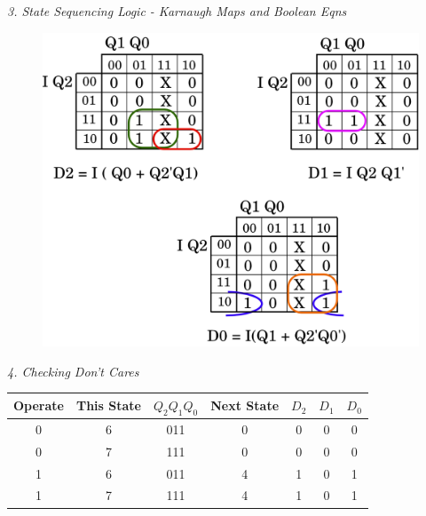 \documentclass[twocolumn,english]{article}
\providecommand{\tabularnewline}{\\}
\begin{document}
\emph{3. State Sequencing Logic - Karnaugh Maps and Boolean Eqns}

\begin{figure}[H]
\noindent \centering{}\includegraphics[width=0.2\paperwidth]{img/ssl-kmaps}
\end{figure}


\emph{4. Checking Don't Cares}

\noindent 
\begin{table}[H]
\noindent \begin{centering}
\begin{tabular}{ccccccc}
\toprule 
{\footnotesize{}Operate} & {\footnotesize{}This State} & {\footnotesize{}$Q_{2}Q_{1}Q_{0}$} & {\footnotesize{}Next State} & {\footnotesize{}$D_{2}$} & {\footnotesize{}$D_{1}$} & {\footnotesize{}$D_{0}$}\tabularnewline
\midrule
{\footnotesize{}0} & {\footnotesize{}6} & {\footnotesize{}011} & {\footnotesize{}0} & {\footnotesize{}0} & {\footnotesize{}0} & {\footnotesize{}0}\tabularnewline
{\footnotesize{}0} & {\footnotesize{}7} & {\footnotesize{}111} & {\footnotesize{}0} & {\footnotesize{}0} & {\footnotesize{}0} & {\footnotesize{}0}\tabularnewline
\midrule
{\footnotesize{}1} & {\footnotesize{}6} & {\footnotesize{}011} & {\footnotesize{}4} & {\footnotesize{}1} & {\footnotesize{}0} & {\footnotesize{}1}\tabularnewline
{\footnotesize{}1} & {\footnotesize{}7} & {\footnotesize{}111} & {\footnotesize{}4} & {\footnotesize{}1} & {\footnotesize{}0} & {\footnotesize{}1}\tabularnewline
\bottomrule
\end{tabular}
\par\end{centering}

\smallskip{}


\noindent {}
\end{table}
\end{document}
